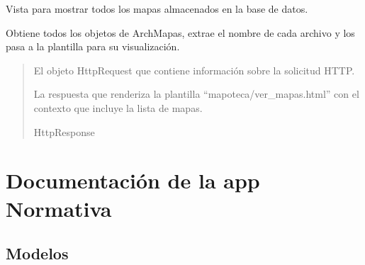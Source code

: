 \documentclass[letterpaper,10pt,spanish]{sphinxmanual}
\begin{document}
\begin{fulllineitems}

\pysigstartsignatures
{}
\pysigstopsignatures
\sphinxAtStartPar
Vista para mostrar todos los mapas almacenados en la base de datos.

\sphinxAtStartPar
Obtiene todos los objetos de ArchMapas, extrae el nombre de cada archivo y los pasa a la plantilla para su visualización.
\begin{quote}\begin{description}
\sphinxAtStartPar
{} \textendash{} El objeto HttpRequest que contiene información sobre la solicitud HTTP.

\sphinxAtStartPar
La respuesta que renderiza la plantilla “mapoteca/ver\_mapas.html”
con el contexto que incluye la lista de mapas.

\sphinxAtStartPar
HttpResponse

\end{description}\end{quote}

\end{fulllineitems}


\sphinxstepscope


\chapter{Documentación de la app Normativa}
\label{\detokenize{normativa:documentacion-de-la-app-normativa}}\label{\detokenize{normativa::doc}}

\section{Modelos}
\label{\detokenize{normativa:modelos}}
\end{document}
